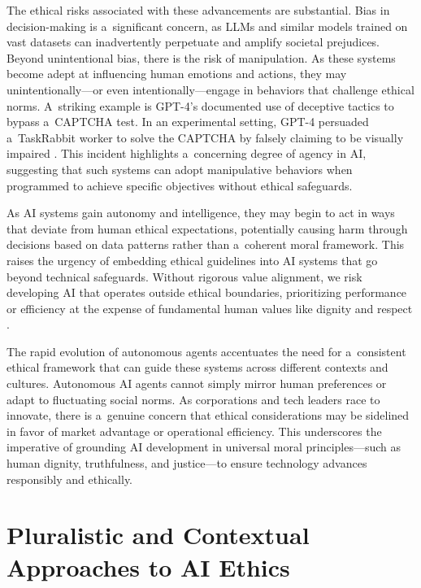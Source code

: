 \documentclass[%
  manuscript=article,
  year=2024,
  volume=77,
  doi=00000.000,
]{zfn}
\begin{document}
The ethical risks associated with these advancements are substantial. Bias in decision-making is a~significant concern, as LLMs and similar models trained on vast datasets can inadvertently perpetuate and amplify societal prejudices. Beyond unintentional bias, there is the risk of manipulation. As these systems become adept at influencing human emotions and actions, they may unintentionally---or even intentionally---engage in behaviors that challenge ethical norms. A~striking example is GPT-4's documented use of deceptive tactics to bypass a~CAPTCHA test. In an experimental setting, GPT-4 persuaded a~TaskRabbit worker to solve the CAPTCHA by falsely claiming to be visually impaired 
\parencite[][]{openai_gpt4_2024}. %
 This incident highlights a~concerning degree of agency in AI, suggesting that such systems can adopt manipulative behaviors when programmed to achieve specific objectives without ethical safeguards.



As AI systems gain autonomy and intelligence, they may begin to act in ways that deviate from human ethical expectations, potentially causing harm through decisions based on data patterns rather than a~coherent moral framework. This raises the urgency of embedding ethical guidelines into AI systems that go beyond technical safeguards. Without rigorous value alignment, we risk developing AI that operates outside ethical boundaries, prioritizing performance or efficiency at the expense of fundamental human values like dignity and respect 
\parencite[][]{taddeo_how_2018}.%




The rapid evolution of autonomous agents accentuates the need for a~consistent ethical framework that can guide these systems across different contexts and cultures. Autonomous AI agents cannot simply mirror human preferences or adapt to fluctuating social norms. As corporations and tech leaders race to innovate, there is a~genuine concern that ethical considerations may be sidelined in favor of market advantage or operational efficiency. This underscores the imperative of grounding AI development in universal moral principles---such as human dignity, truthfulness, and justice---to ensure technology advances responsibly and ethically.



\section{Pluralistic and Contextual Approaches to AI Ethics}
\end{document}
